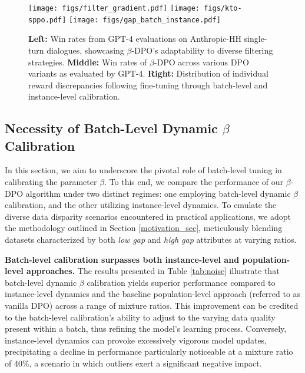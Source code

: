 \begin{figure}
    \centering
    \texttt{[image: figs/filter\_gradient.pdf]}
    \texttt{[image: figs/kto-sppo.pdf]}
    \texttt{[image: figs/gap\_batch\_instance.pdf]}
    \caption{
    \textbf{Left:} Win rates from GPT-4 evaluations on Anthropic-HH single-turn dialogues, showcasing $\beta$-DPO's adaptability to diverse filtering strategies. \textbf{Middle:} Win rates of $\beta$-DPO across various DPO variants as evaluated by GPT-4. \textbf{Right:} Distribution of individual reward discrepancies following fine-tuning through batch-level and instance-level calibration.
    }
    
    \label{fig:gradient}
\end{figure}

\subsection{Necessity of Batch-Level Dynamic $\beta$ Calibration}
\label{sec_batch_level}
In this section, we aim to underscore the pivotal role of batch-level tuning in calibrating the parameter $\beta$. To this end, we compare the performance of our $\beta$-DPO algorithm under two distinct regimes: one employing batch-level dynamic $\beta$ calibration, and the other utilizing instance-level dynamics. To emulate the diverse data disparity scenarios encountered in practical applications, we adopt the methodology outlined in Section \ref{motivation_sec}, meticulously blending datasets characterized by both \emph{low gap} and \emph{high gap} attributes at varying ratios.

\textbf{Batch-level calibration surpasses both instance-level and population-level approaches.} The results presented in Table \ref{tab:noise} illustrate that batch-level dynamic $\beta$ calibration yields superior performance compared to instance-level dynamics and the baseline population-level approach (referred to as vanilla DPO) across a range of mixture ratios. This improvement can be credited to the batch-level calibration's ability to adjust to the varying data quality present within a batch, thus refining the model's learning process.
Conversely, instance-level dynamics can provoke excessively vigorous model updates, precipitating a decline in performance particularly noticeable at a mixture ratio of 40\%, a scenario in which outliers exert a significant negative impact.

